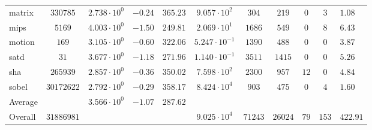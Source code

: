 \begin{tabular}{|l|c|HHc|c|c|c|c|cH|}
matrix        & $ 330785   $ & $ 2.738 \cdot 10^{0} $ & $ -0.24 $ & $ 365.23 $ & $ 9.057 \cdot 10^{2}  $ & $ 304   $ & $ 219   $ & $ 0   $ & $ 3   $ & $ 1.08    $ \\
mips          & $ 5169     $ & $ 4.003 \cdot 10^{0} $ & $ -1.50 $ & $ 249.81 $ & $ 2.069 \cdot 10^{1}  $ & $ 1686  $ & $ 549   $ & $ 0   $ & $ 8   $ & $ 6.43    $ \\
motion        & $ 169      $ & $ 3.105 \cdot 10^{0} $ & $ -0.60 $ & $ 322.06 $ & $ 5.247 \cdot 10^{-1} $ & $ 1390  $ & $ 488   $ & $ 0   $ & $ 0   $ & $ 3.87    $ \\
satd          & $ 31       $ & $ 3.677 \cdot 10^{0} $ & $ -1.18 $ & $ 271.96 $ & $ 1.140 \cdot 10^{-1} $ & $ 3511  $ & $ 1415  $ & $ 0   $ & $ 0   $ & $ 5.26    $ \\
sha           & $ 265939   $ & $ 2.857 \cdot 10^{0} $ & $ -0.36 $ & $ 350.02 $ & $ 7.598 \cdot 10^{2}  $ & $ 2300  $ & $ 957   $ & $ 12  $ & $ 0   $ & $ 4.84    $ \\
sobel         & $ 30172622 $ & $ 2.792 \cdot 10^{0} $ & $ -0.29 $ & $ 358.17 $ & $ 8.424 \cdot 10^{4}  $ & $ 903   $ & $ 475   $ & $ 0   $ & $ 4   $ & $ 1.60    $ \\
\hline
Average       & $          $ & $ 3.566 \cdot 10^{0} $ & $ -1.07 $ & $ 287.62 $ & $                     $ & $       $ & $       $ & $     $ & $     $ & $         $ \\
\hline
Overall       & $ 31886981 $ & $                    $ & $       $ & $        $ & $ 9.025 \cdot 10^{4}  $ & $ 71243 $ & $ 26024 $ & $ 79  $ & $ 153 $ & $ 422.91  $ \\
\hline
\end{tabular}
